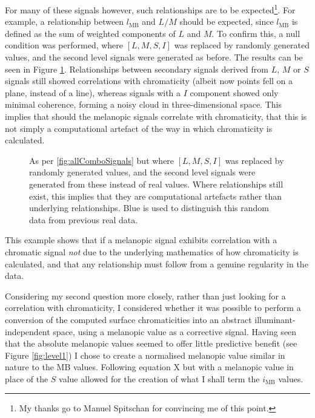 For many of these signals however, such relationships are to be expected\footnote{My thanks go to Manuel Spitschan for convincing me of this point.}. For example, a relationship between $l_{\text{MB}}$ and $L/M$ should be expected, since $l_{\text{MB}}$ is defined as the sum of weighted components of $L$ and $M$. To confirm this, a null condition was performed, where $[L,M,S,I]$ was replaced by randomly generated values, and the second level signals were generated as before. The results can be seen in Figure \ref{fig:allComboSignals_rand}. Relationships between secondary signals derived from $L$, $M$ or $S$ signals still showed correlations with chromaticity (albeit now points fell on a plane, instead of a line), whereas signals with a $I$ component showed only minimal coherence, forming a noisy cloud in three-dimensional space. This implies that should the melanopic signals correlate with chromaticity, that this is not simply a computational artefact of the way in which chromaticity is calculated.

\clearpage

\begin{figure}[h!]
    \caption{As per \ref{fig:allComboSignals} but where $[L,M,S,I]$ was replaced by randomly generated values, and the second level signals were generated from these instead of real values. Where relationships still exist, this implies that they are computational artefacts rather than underlying relationships. Blue is used to distinguish this random data from previous real data.}
    \label{fig:allComboSignals_rand}
\end{figure} 

This example shows that if a melanopic signal exhibits correlation with a chromatic signal \emph{not} due to the underlying mathematics of how chromaticity is calculated, and that any relationship must follow from a genuine regularity in the data.

Considering my second question more closely, rather than just looking for a correlation with chromaticity, I considered whether it was possible to perform a conversion of the computed surface chromaticities into an abstract illuminant-independent space, using a melanopic value as a corrective signal. Having seen that the absolute melanopic values seemed to offer little predictive benefit (see Figure \ref{fig:level1}) I chose to create a normalised melanopic value similar in nature to the MB values. Following equation X %
but with a melanopic value in place of the $S$ value allowed for the creation of what I shall term the $i_{\text{MB}}$ values.

